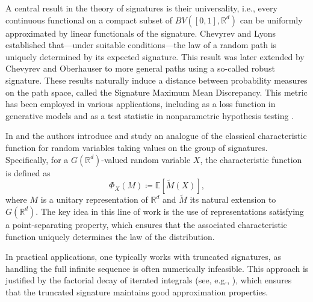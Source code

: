 \documentclass[pdflatex,sn-mathphys-num]{sn-jnl}
\theoremstyle{thmstyletwo}
\theoremstyle{thmstyleone}
\theoremstyle{thmstyletwo}
\newcommand{\R}{\mathbb{R}}
\newcommand{\C}{\mathbb{C}}
\begin{document}
A central result in the theory of signatures is their universality, i.e., every continuous functional on a compact subset of $BV([0,1], \R^d)$ can be uniformly approximated by linear functionals of the signature. Chevyrev and Lyons \cite{Chevyrev_2016} established that---under suitable conditions---the law of a random path is uniquely determined by its expected signature. This result was later extended by Chevyrev and Oberhauser \cite{chevyrev2022signature} to more general paths using a so-called robust signature. These results naturally induce a distance between probability measures on the path space, called the Signature Maximum Mean Discrepancy. This metric has been employed in various applications, including as a loss function in generative models \cite{ni2021sig} and as a test statistic in nonparametric hypothesis testing \cite{hao_ni2024}. 

In \cite{Chevyrev_2016} and \cite{hao_ni2024} the authors introduce and study an analogue of the classical characteristic function for random variables taking values on the group of signatures. Specifically, for a $G(\R^d)$-valued random variable $X$, the characteristic function is defined as
\begin{equation*}
    \Phi_X(M)\coloneq \mathbb E[\tilde M(X)],
\end{equation*}
where $M$ is a unitary representation of $\R^d$ and $\tilde M$ its natural extension to $G(\R^d)$. The key idea in this line of work is the use of representations satisfying a point-separating property, which ensures that the associated characteristic function uniquely determines the law of the distribution.

In practical applications, one typically works with truncated signatures, as handling the full infinite sequence is often numerically infeasible. This approach is justified by the factorial decay of iterated integrals (see, e.g., \cite{chevyrev2022signature}), which ensures that the truncated signature maintains good approximation properties.
\end{document}
